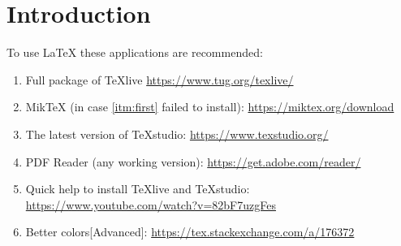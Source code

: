 
\section{Introduction}	
\label{sec:intro}

To use \LaTeX{} these applications are recommended:

\begin{enumerate}
	\item \label{itm:first} Full package of TeXlive \url{https://www.tug.org/texlive/}
	\item MikTeX (in case \ref{itm:first} failed to install):  \url{https://miktex.org/download}
	\item The latest version of TeXstudio: \url{https://www.texstudio.org/}
	\item PDF Reader (any working version): \url{https://get.adobe.com/reader/}
	\item Quick help to install TeXlive and TeXstudio: \url{ https://www.youtube.com/watch?v=82bF7uzgFes}
	\item Better colors[Advanced]: \url{https://tex.stackexchange.com/a/176372}
\end{enumerate}

